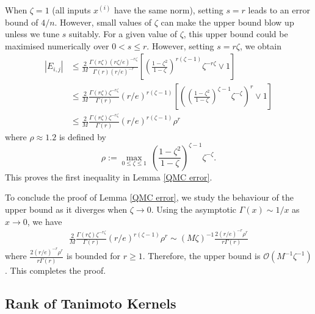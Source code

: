 When $\zeta=1$ (all inputs $x^{(i)}$ have the same norm), setting $s=r$ leads to an  error bound of $4/n$. However, small values of $\zeta$ can make the upper bound blow up unless we tune $s$ suitably. For a given value of $\zeta$, this upper bound could be maximised numerically over $0<s\le r$. However, setting $s = r\zeta$, we obtain
\begin{align*}
|E_{i,j}|
&\leq \frac{2}{M} \frac{\Gamma(r\zeta)(r\zeta /e)^{-r\zeta}}{\Gamma(r)(r/e)^{-r}} \left[\left(\frac{1-\zeta^2}{1-\zeta}\right)^{r(\zeta-1)} \zeta^{-r\zeta} \vee 1 \right]  \\
&\leq \frac{2}{M} \frac{\Gamma(r\zeta)\zeta^{-r\zeta}}{\Gamma(r)} (r/e)^{r(\zeta-1)}\left[\left(\left(\frac{1-\zeta^2}{1-\zeta}\right)^{\zeta-1} \zeta^{-\zeta}\right)^r \vee 1 \right] \\
&\leq \frac{2}{M} \frac{\Gamma(r\zeta)\zeta^{-r\zeta}}{\Gamma(r)} (r/e)^{r(\zeta-1)} \rho^r
\end{align*} 
where $\rho\approx 1.2$ is defined by 
$$\rho := \max_{0\leq \zeta\leq 1}~\left(\frac{1-\zeta^2}{1-\zeta}\right)^{\zeta-1} \zeta^{-\zeta}.$$
This proves the first inequality in Lemma \ref{QMC error}. 

To conclude the proof of Lemma \ref{QMC error}, we study the behaviour of the upper bound as it diverges when $\zeta\to 0$. Using the asymptotic $\Gamma(x)\sim 1/x$ as $x\to0$, we have
\begin{align*}
\frac{2}{M} \frac{\Gamma(r\zeta)\zeta^{-r\zeta}}{\Gamma(r)} (r/e)^{r(\zeta-1)} \rho^r \sim (M\zeta)^{-1} \frac{2(r/e)^{-r} \rho^r}{r\Gamma(r)} 
\end{align*}
where $\frac{2(r/e)^{-r} \rho^r}{r\Gamma(r)}$ is bounded for $r\ge 1$. Therefore, the upper bound is $\mathcal O(M^{-1}\zeta^{-1})$.
This completes the proof.




\subsection{Rank of Tanimoto Kernels}\label{apdx:proof-of-kernel-rank}

